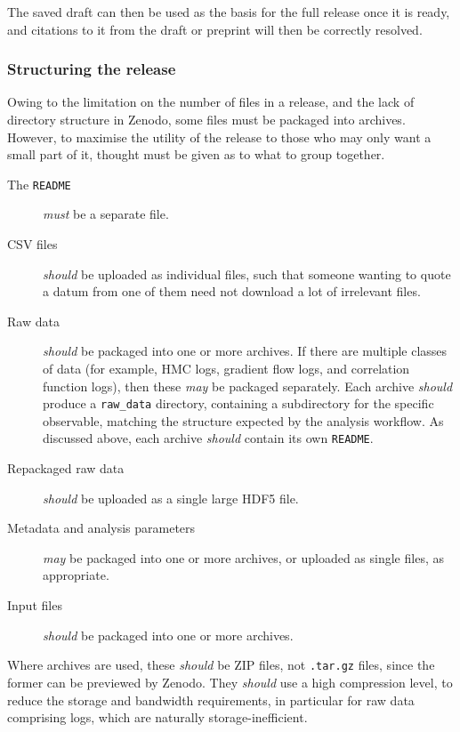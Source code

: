 \documentclass{article}
\newcommand\rfcword[1]{\emph{#1}\xspace}
\newcommand\must{\rfcword{must}}
\newcommand\should{\rfcword{should}}
\newcommand\may{\rfcword{may}}
\newcommand\filename[1]{\texttt{#1}\xspace}
\newcommand\readme{\filename{README}}
\begin{document}
The saved draft can then be used as the basis for the full release once it is ready,
and citations to it from the draft or preprint will then be correctly resolved.

\subsubsection{Structuring the release}

Owing to the limitation on the number of files in a release,
and the lack of directory structure in Zenodo,
some files must be packaged into archives.
However,
to maximise the utility of the release to
those who may only want a small part of it,
thought must be given as to what to group together.

\begin{description}
  \item[The \readme]
        \must be a separate file.
  \item[CSV files]
        \should be uploaded as individual files,
        such that someone wanting to quote a datum from one of them
        need not download a lot of irrelevant files.
  \item[Raw data]
        \should be packaged into one or more archives.
        If there are multiple classes of data
        (for example,
        HMC logs, gradient flow logs, and correlation function logs),
        then these \may be packaged separately.
        Each archive \should produce a \filename{raw\_data} directory,
        containing a subdirectory for the specific observable,
        matching the structure expected by the analysis workflow.
        As discussed above,
        each archive \should contain its own \readme.
  \item[Repackaged raw data]
        \should be uploaded as a single large HDF5 file.
  \item[Metadata and analysis parameters]
        \may be packaged into one or more archives,
        or uploaded as single files,
        as appropriate.
  \item[Input files]
        \should be packaged into one or more archives.
\end{description}

Where archives are used,
these \should be ZIP files,
not \filename{.tar.gz} files,
since the former can be previewed by Zenodo.
They \should use a high compression level,
to reduce the storage and bandwidth requirements,
in particular for raw data comprising logs,
which are naturally storage-inefficient.
\end{document}
